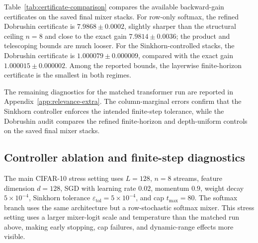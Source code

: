 \documentclass[10pt]{article}
\numberwithin{equation}{section}
\theoremstyle{plain}
\theoremstyle{definition}
\theoremstyle{remark}
\begin{document}
Table~\ref{tab:certificate-comparison} compares the available backward-gain
certificates on the saved final mixer stacks. For row-only softmax, the refined
Dobrushin certificate is \(7.9868\pm0.0002\), slightly sharper than the
structural ceiling \(n=8\) and close to the exact gain
\(7.9814\pm0.0036\); the product and telescoping bounds are much looser. For the
Sinkhorn-controlled stacks, the Dobrushin certificate is
\(1.000079\pm0.000009\), compared with the exact gain
\(1.000015\pm0.000002\). Among the reported bounds, the layerwise finite-horizon certificate is the smallest in both regimes.

The remaining diagnostics for the matched transformer run are reported in
Appendix~\ref{app:relevance-extra}. The column-marginal errors confirm that the
Sinkhorn controller enforces the intended finite-step tolerance, while the
Dobrushin audit compares the refined finite-horizon and depth-uniform controls
on the saved final mixer stacks.

\subsection{Controller ablation and finite-step diagnostics}
The main CIFAR-10 stress setting uses \(L=128\), \(n=8\) streams, feature dimension
\(d=128\), SGD with learning rate \(0.02\), momentum \(0.9\), weight decay
\(5\times 10^{-4}\), Sinkhorn tolerance \(\varepsilon_{\mathrm{tol}}=5\times10^{-4}\),
and cap \(t_{\max}=80\). The softmax branch uses the same architecture but a
row-stochastic softmax mixer. This stress setting uses a larger mixer-logit scale
and temperature than the matched run above, making early stopping, cap failures,
and dynamic-range effects more visible.
\end{document}
